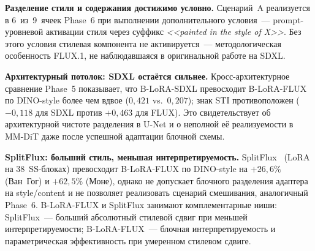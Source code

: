 \textbf{Разделение стиля и содержания достижимо условно.} Сценарий~A реализуется в 6~из~9~ячеек Phase~6 при выполнении дополнительного условия~--- prompt-уровневой активации стиля через суффикс \textit{<<painted in the style of X>>}. Без этого условия стилевая компонента не активируется~--- методологическая особенность FLUX.1, не наблюдавшаяся в оригинальной работе на SDXL.

\textbf{Архитектурный потолок: SDXL остаётся сильнее.} Кросс-архитектурное сравнение Phase~5 показывает, что B-LoRA-SDXL превосходит B-LoRA-FLUX по DINO-style более чем вдвое ($0{,}421$ vs.\ $0{,}207$); знак STI противоположен ($-0{,}118$ для SDXL против $+0{,}463$ для FLUX). Это свидетельствует об архитектурной чистоте разделения в U-Net и о неполной её реализуемости в MM-DiT даже после успешной адаптации блочной схемы.

\textbf{SplitFlux: больший стиль, меньшая интерпретируемость.} SplitFlux~\cite{yang2025splitflux} (LoRA на 38~SS-блоках) превосходит B-LoRA-FLUX по DINO-style на $+26{,}6\%$ (Ван~Гог) и $+62{,}5\%$ (Моне), однако не допускает блочного разделения адаптера на style/content и не позволяет реализовать сценарий смешивания, аналогичный Phase~6. B-LoRA-FLUX и SplitFlux занимают комплементарные ниши: SplitFlux~--- больший абсолютный стилевой сдвиг при меньшей интерпретируемости; B-LoRA-FLUX~--- блочная интерпретируемость и параметрическая эффективность при умеренном стилевом сдвиге.
